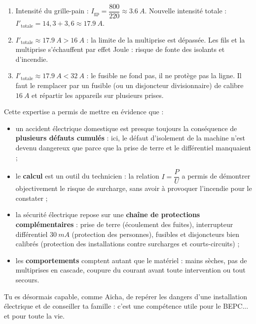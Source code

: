 \documentclass[11pt]{article}
\newcounter{popsec}
\newcounter{popsub}
\newcommand{\courssub}[1]{%
  \stepcounter{popsub}%
  \par\vspace{9pt}\noindent{\popxbold\fontsize{11.5}{13}\selectfont\color{popink}{\color{poporange}\thepopsec.\thepopsub}\hspace{6pt}#1}\par\nopagebreak\vspace{4pt}
}
\begin{document}
\begin{corrige}
\begin{enumerate}
\item Intensité du grille-pain : $I_{\text{gp}} = \dfrac{800}{220} \approx \SI{3,6}{A}$. Nouvelle intensité totale : $I'_{\text{totale}} = 14,3 + 3,6 \approx \SI{17,9}{A}$.
\item $I'_{\text{totale}} \approx \SI{17,9}{A} > \SI{16}{A}$ : la limite de la multiprise est dépassée. Les fils et la multiprise s'échauffent par effet Joule : risque de fonte des isolants et d'incendie.
\item $I'_{\text{totale}} \approx \SI{17,9}{A} < \SI{32}{A}$ : le fusible ne fond pas, il ne protège pas la ligne. Il faut le remplacer par un fusible (ou un disjoncteur divisionnaire) de calibre $\SI{16}{A}$ et répartir les appareils sur plusieurs prises.
\end{enumerate}
\end{corrige}

\courssub{Bilan de l'activité}

Cette expertise a permis de mettre en évidence que :

\begin{itemize}
\item un accident électrique domestique est presque toujours la conséquence de \textbf{plusieurs défauts cumulés} : ici, le défaut d'isolement de la machine n'est devenu dangereux que parce que la prise de terre et le différentiel manquaient ;
\item le \textbf{calcul} est un outil du technicien : la relation $I = \dfrac{P}{U}$ a permis de démontrer objectivement le risque de surcharge, sans avoir à provoquer l'incendie pour le constater ;
\item la sécurité électrique repose sur une \textbf{chaîne de protections complémentaires} : prise de terre (écoulement des fuites), interrupteur différentiel $\SI{30}{mA}$ (protection des personnes), fusibles et disjoncteurs bien calibrés (protection des installations contre surcharges et courts-circuits) ;
\item les \textbf{comportements} comptent autant que le matériel : mains sèches, pas de multiprises en cascade, coupure du courant avant toute intervention ou tout secours.
\end{itemize}

Tu es désormais capable, comme Aïcha, de repérer les dangers d'une installation électrique et de conseiller ta famille : c'est une compétence utile pour le BEPC... et pour toute la vie.
\end{document}

